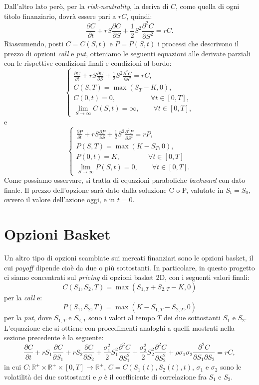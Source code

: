\documentclass[a4paper,10pt]{report}
\newcommand{\der}[2]{\frac{\partial #1}{\partial #2}}
\newcommand{\dder}[2]{\frac{\partial^2 #1}{\partial #2^2}}
\newcommand{\dmix}[3]{\frac{\partial^2 #1}{\partial #2 \partial #3}}
\theoremstyle{plain}
\theoremstyle{definition}
\theoremstyle{remark}
\begin{document}
Dall'altro lato per\`o, per la \emph{risk-neutrality}, la deriva di $C$, come quella di ogni titolo finanziario, dovr\`a essere pari a $rC$, quindi:$$\der{C}{t}+r S \der{C}{S} +\frac{1}{2}S^2\dder{C}{S}=rC.$$
Riassumendo, posti $C=C(S,t)$ e $P=P(S,t)$ i processi che descrivono il prezzo di opzioni \emph{call} e \emph{put}, otteniamo le seguenti equazioni alle derivate parziali con le rispettive condizioni finali e condizioni al bordo:
\begin{equation}
\begin{cases}
\displaystyle
\der{C}{t}+r S \der{C}{S} +\frac{1}{2}S^2\dder{C}{S}=rC,\\
C(S,T)=\max(S_T-K,0),\\
C(0,t)=0,\qquad\quad\qquad\forall t\in[0,T],\\
\lim\limits_{S\to\infty}C(S,t)=\infty,\qquad\forall t\in[0,T],
\end{cases}
\label{callbs1d}
\end{equation}
e
\begin{equation}
\begin{cases}
\displaystyle
\der{P}{t}+r S \der{P}{S} +\frac{1}{2}S^2\dder{P}{S}=rP,\\
P(S,T)=\max(K-S_T,0),\\
P(0,t)=K,\qquad\qquad\forall t\in[0,T]\\
\lim\limits_{S\to\infty}P(S,t)=0,\qquad\forall t\in[0,T].
\end{cases}
\label{putbs1d}
\end{equation}
Come possiamo osservare, si tratta di equazioni paraboliche \emph{backward} con dato finale. Il prezzo dell'opzione sar\`a dato dalla soluzione C o P, valutate in $S_t=S_0$, ovvero il valore dell'azione oggi, e in $t=0$.

\section{Opzioni Basket}
Un altro tipo di opzioni scambiate sui mercati finanziari sono le opzioni basket, il cui \emph{payoff} dipende cio\`e da due o pi\`u sottostanti. In particolare, in questo progetto ci siamo concentrati sul \emph{pricing} di opzioni basket 2D, con i seguenti valori finali: $$C(S_1, S_2, T)=\max(S_{1,T}+S_{2,T}-K,0)$$ per la \emph{call} e: $$P(S_1, S_2, T)=\max(K-S_{1,T}-S_{2,T},0)$$ per la \emph{put}, dove $S_{1,T}$ e $S_{2,T}$ sono i valori al tempo $T$ dei due sottostanti $S_1$ e $S_2$.\\L'equazione che si ottiene con procedimenti analoghi a quelli mostrati nella sezione precedente \`e la seguente:
\begin{equation}
\der{C}{t}+rS_1\der{C}{S_1}+rS_2\der{C}{S_2}+\frac{\sigma^2_1}{2}S_1^2\dder{C}{S_1}+\frac{\sigma^2_2}{2}S_2^2\dder{C}{S_2}+\rho\sigma_1\sigma_2\dmix{C}{S_1}{S_2}=rC,
\label{pde2d}
\end{equation}
in cui $C:\mathbb{R}^+\times\mathbb{R}^+\times[0,T]\rightarrow\mathbb{R}^+$, $C=C(S_1(t), S_2(t),t)$, $\sigma_1$ e $\sigma_2$ sono le volatilit\`a dei due sottostanti e $\rho$ \`e il coefficiente di correlazione fra $S_1$ e $S_2$.
\end{document}
